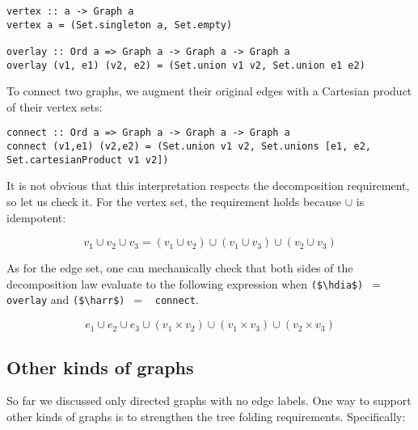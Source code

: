 \documentclass[english,submission]{programming}
\newcommand{\code}[1]{\lstinline[mathescape]|#1|}
\newcommand{\hcode}[1]{{\color{darkblue} \lstinline[keywordstyle={}]|#1|}} %
\newcommand{\hdia}{\,\text{\raisebox{-0.2mm}{\Large\color{darkblue} $\diamond$}}\,}
\newcommand{\harr}{\,\text{\color{darkblue} $\rightarrow$}\,}
\begin{document}
\begin{lstlisting}
vertex :: a -> Graph a
vertex a = (Set.singleton a, Set.empty)

overlay :: Ord a => Graph a -> Graph a -> Graph a
overlay (v1, e1) (v2, e2) = (Set.union v1 v2, Set.union e1 e2)
\end{lstlisting}

\noindent
To connect two graphs, we augment their original edges with a Cartesian product
of their vertex sets:

\begin{lstlisting}
connect :: Ord a => Graph a -> Graph a -> Graph a
connect (v1,e1) (v2,e2) = (Set.union v1 v2, Set.unions [e1, e2, Set.cartesianProduct v1 v2])
\end{lstlisting}

\noindent
It is not obvious that this interpretation respects the decomposition
requirement, so let us check it. For the vertex set, the requirement holds
because $\cup$ is idempotent:

\vspace{-5mm}
\begin{equation*}
v_1 \cup v_2 \cup v_3 = (v_1 \cup v_2) \cup (v_1 \cup v_3) \cup (v_2 \cup v_3)
\end{equation*}
\vspace{-5mm}

\noindent
As for the edge set, one can mechanically check that both sides of the
decomposition law evaluate to the following expression when
\code{($\hdia$)}~$=$~\hcode{overlay} and \code{($\harr$)}~$=$~\hcode{connect}.

\vspace{-5mm}
\begin{equation*}
e_1 \cup e_2 \cup e_3 \cup (v_1 \times v_2) \cup (v_1 \times v_3) \cup (v_2 \times v_3)
\end{equation*}
\vspace{-5mm}

\subsection{Other kinds of graphs}\label{sec-other-graphs}

So far we discussed only directed graphs with no edge labels. One way to support
other kinds of graphs is to strengthen the tree folding requirements.
Specifically:
\end{document}
